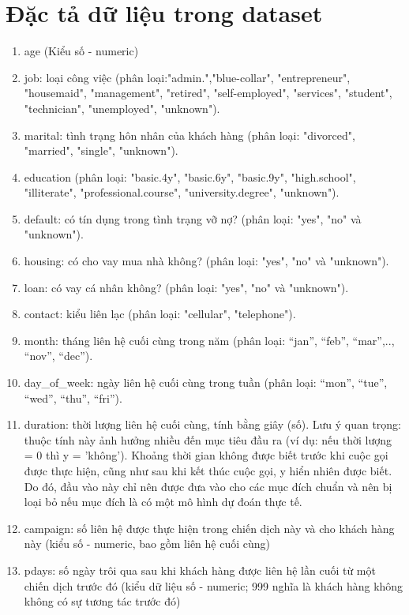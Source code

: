 \documentclass{report}
\begin{document}
\section{Đặc tả dữ liệu trong dataset}
    \fontsize{13}{10}\selectfont
    \begin{enumerate}
        \item age (Kiểu số - numeric)
        \item job: loại công việc (phân loại:"admin.","blue-collar", "entrepreneur", "housemaid", "management", "retired", "self-employed", "services", "student", "technician", "unemployed", "unknown").
        \item marital: tình trạng hôn nhân của khách hàng (phân loại: "divorced", "married", "single", "unknown").
        \item education (phân loại: "basic.4y", "basic.6y", "basic.9y", "high.school", "illiterate", "professional.course", "university.degree", "unknown").
        \item default: có tín dụng trong tình trạng vỡ nợ? (phân loại: "yes",  "no" và "unknown").
        \item housing: có cho vay mua nhà không? (phân loại: "yes",  "no" và "unknown").
        \item loan: có vay cá nhân không? (phân loại: "yes",  "no" và "unknown").
        \item contact: kiểu liên lạc (phân loại: "cellular", "telephone").
        \item month: tháng liên hệ cuối cùng trong năm (phân loại: “jan”, “feb”, “mar”,.., “nov”, “dec”).
        \item day\_of\_week: ngày liên hệ cuối cùng trong tuần (phân loại: “mon”, “tue”, “wed”, “thu”, “fri”).
        \item duration: thời lượng liên hệ cuối cùng, tính bằng giây (số). Lưu ý quan trọng: thuộc tính này ảnh hưởng nhiều đến mục tiêu đầu ra (ví dụ: nếu thời lượng = 0 thì y = ’không’). Khoảng thời gian không được biết trước khi cuộc gọi được thực hiện, cũng như sau khi kết thúc cuộc gọi, y hiển nhiên được biết. Do đó, đầu vào này chỉ nên được đưa vào cho các mục đích chuẩn và nên bị loại bỏ nếu mục đích là có một mô hình dự đoán thực tế.
        \item campaign: số liên hệ được thực hiện trong chiến dịch này và cho khách hàng này (kiểu số - numeric, bao gồm liên hệ cuối cùng)
        \item pdays: số ngày trôi qua sau khi khách hàng được liên hệ lần cuối từ một chiến dịch trước đó (kiểu dữ liệu số - numeric; 999 nghĩa là khách hàng không không có sự tương tác trước đó)

\end{enumerate}
\end{document}
